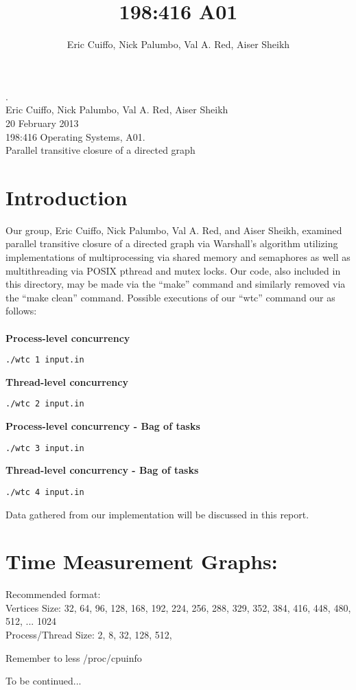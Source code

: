 \documentclass[10pt]{article}
\begin{document}
\title{198:416 A01}
\author{Eric Cuiffo, Nick Palumbo, Val A. Red, Aiser Sheikh}

\fancyhead{}
.\\
Eric Cuiffo, Nick Palumbo, Val A. Red, Aiser Sheikh\\
20 February 2013 \\
198:416 Operating Systems, A01. \\
 Parallel transitive closure of a directed graph

\section{Introduction}

Our group, Eric Cuiffo, Nick Palumbo, Val A. Red, and Aiser Sheikh, examined parallel transitive closure of a directed graph via Warshall’s algorithm utilizing implementations of multiprocessing via shared memory and semaphores as well as multithreading via POSIX pthread and mutex locks. Our code, also included in this directory, may be made via the ``make'' command and similarly removed via the ``make clean'' command. Possible executions of our ``wtc'' command our as follows: \\ \\
{\bfseries Process-level concurrency} 
\begin{verbatim}
./wtc 1 input.in
\end{verbatim}
{\bfseries Thread-level concurrency} \\
\begin{verbatim}
./wtc 2 input.in
\end{verbatim}
{\bfseries Process-level concurrency - Bag of tasks} \\
\begin{verbatim}
./wtc 3 input.in
\end{verbatim}
{\bfseries Thread-level concurrency - Bag of tasks} \\
\begin{verbatim}
./wtc 4 input.in
\end{verbatim}

Data gathered from our implementation will be discussed in this report.

\section{Time Measurement Graphs:}

Recommended format: \\
Vertices Size: 32, 64, 96, 128, 168, 192, 224, 256, 288, 329, 352, 384, 416, 448, 480, 512, ... 1024  \\
Process/Thread Size:
2, 
8,
32,
128,
512,

Remember to less /proc/cpuinfo

To be continued...
\end{document}
